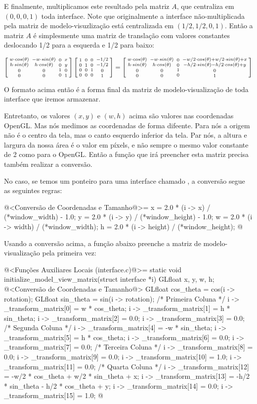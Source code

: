 E finalmente, multiplicamos este resultado pela matriz $A$, que
centraliza em $(0, 0, 0, 1)$ toda interface. Note que originalmente
a interface não-multiplicada pela matriz de modelo-visuzlização está
centralizada em $(1/2, 1/2, 0, 1)$. Então a matriz $A$ é simplesmente
uma matriz de translação com valores constantes deslocando 1/2 para a
esquerda e 1/2 para baixo:

$$
\left[{{w\cdot cos(\theta) \atop h\cdot sin(\theta)}\atop {0\atop 0}}
  {{-w\cdot sin(\theta) \atop h\cdot cos(\theta)}\atop {0 \atop 0}}
  {{0\atop 0}\atop{1 \atop 0}}
  {{x \atop y}\atop{0\atop 1}}\right]
\left[{{1 \atop 0}\atop {0\atop 0}}{{0 \atop 1}\atop {0 \atop
      0}}{{0\atop 0}\atop{1 \atop 0}}{{-1/2 \atop -1/2}\atop{0\atop
      1}}\right]=
\left[{{w\cdot cos(\theta) \atop h\cdot sin(\theta)}\atop {0\atop 0}}
  {{-w\cdot sin(\theta) \atop h\cdot cos(\theta)}\atop {0 \atop 0}}
  {{0\atop 0}\atop{1 \atop 0}} {{-w/2\cdot cos(\theta) + w/2\cdot
  sin(\theta)+x \atop -h/2\cdot sin(\theta)-h/2\cdot
  cos(\theta)+y}\atop{0\atop 1}}\right]
$$

O formato acima então é a forma final da matriz de modelo-visualização
de toda interface que iremos armazenar.

Entretanto, os valores $(x, y)$ e $(w, h)$ acima são valores nas
coordenadas OpenGL. Mas nós medimos as coordenadas de forma
difeente. Para nós a origem não é o centro da tela, mas o canto
esquerdo inferior da tela. Par nós, a altura e largura da nossa área é
o valor em píxels, e não sempre o mesmo valor constante de 2 como para
o OpenGL. Então a função que irá preencher esta matriz precisa também
realizar a conversão.

No caso, se temos um ponteiro para uma interface
chamado , a conversão segue as seguintes regras:

\iniciocodigo
@<Conversão de Coordenadas e Tamanho@>=
x = 2.0 * (i -> x) / (*window_width) - 1.0;
y = 2.0 * (i -> y) / (*window_height) - 1.0;
w = 2.0 * (i -> width) / (*window_width);
h = 2.0 * (i -> height) / (*window_height);
@
\fimcodigo

Usando a conversão acima, a função abaixo preenche a matriz de
modelo-visualização pela primeira vez:

\iniciocodigo
@<Funções Auxiliares Locais (interface.c)@>=
static void initialize_model_view_matrix(struct interface *i){
  GLfloat x, y, w, h;
  @<Conversão de Coordenadas e Tamanho@>
  GLfloat cos_theta = cos(i -> rotation);
  GLfloat sin_theta = sin(i -> rotation);
  /* Primeira Coluna */
  i -> _transform_matrix[0] = w * cos_theta;
  i -> _transform_matrix[1] = h * sin_theta;
  i -> _transform_matrix[2] = 0.0;
  i -> _transform_matrix[3] = 0.0;
  /* Segunda Coluna */
  i -> _transform_matrix[4] = -w * sin_theta;
  i -> _transform_matrix[5] = h * cos_theta;
  i -> _transform_matrix[6] = 0.0;
  i -> _transform_matrix[7] = 0.0;
  /* Terceira Coluna */
  i -> _transform_matrix[8] = 0.0;
  i -> _transform_matrix[9] = 0.0;
  i -> _transform_matrix[10] = 1.0;
  i -> _transform_matrix[11] = 0.0;
  /* Quarta Coluna */
  i -> _transform_matrix[12] = -w/2 * cos_theta + w/2 * sin_theta + x;
  i -> _transform_matrix[13] = -h/2 * sin_theta - h/2 * cos_theta + y;
  i -> _transform_matrix[14] = 0.0;
  i -> _transform_matrix[15] = 1.0;
}
@
\fimcodigo

